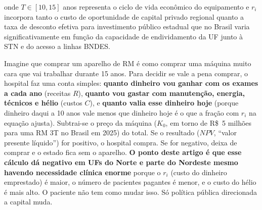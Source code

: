 \documentclass[12pt,a4paper,oneside]{article}
\begin{document}
\noindent onde $T \in [10, 15]$ anos representa o ciclo de vida
econômico do equipamento e $r_i$ incorpora tanto o custo de
oportunidade de capital privado regional quanto a taxa de desconto
efetiva para investimento público estadual \textemdash{} que no
Brasil varia significativamente em função da capacidade de
endividamento da UF junto à STN e do acesso a linhas BNDES.

\begin{tcolorbox}[colback=blue!4,colframe=blue!50!black,
                  sharp corners,boxrule=0.4pt,
                  title=\textbf{Em linguagem simples: o que essa
                  equação está dizendo?},fonttitle=\small\bfseries]
\small
Imagine que comprar um aparelho de RM é como comprar uma máquina
muito cara que vai trabalhar durante 15 anos. Para decidir se vale
a pena comprar, o hospital faz uma conta simples: \textbf{quanto
dinheiro vou ganhar com os exames a cada ano} (receitas $R$),
\textbf{quanto vou gastar com manutenção, energia, técnicos e
hélio} (custos $C$), e \textbf{quanto valia esse dinheiro hoje}
(porque dinheiro daqui a 10 anos vale menos que dinheiro hoje
\textemdash{} é o que a fração com $r_i$ na equação ajusta).
Subtrai-se o preço da máquina ($K_0$, em torno de R\$~5
milhões para uma RM 3T no Brasil em 2025) do total. Se o resultado
($\mathit{NPV}$, ``valor presente líquido'') for positivo, o
hospital compra. Se for negativo, deixa de comprar e o estado
fica sem o aparelho. \textbf{O ponto deste artigo é que esse
cálculo dá negativo em UFs do Norte e parte do Nordeste mesmo
havendo necessidade clínica enorme} \textemdash{} porque o $r_i$
(custo do dinheiro emprestado) é maior, o número de pacientes
pagantes é menor, e o custo do hélio é mais alto. O paciente não
tem como mudar isso. Só política pública direcionada a capital
muda.
\end{tcolorbox}
\end{document}
